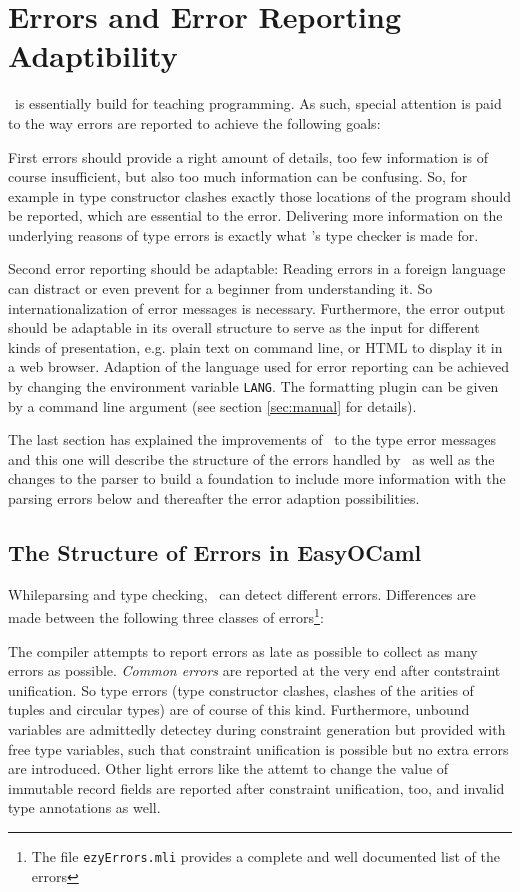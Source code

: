 
\section{Errors and Error Reporting Adaptibility}
\label{sec:errors}

\easyocaml\ is essentially build for teaching programming.
As such, special attention is paid to the way errors are reported to achieve
the following goals:

First errors should provide a right amount of details, too few information
is of course insufficient, but also too much information can be confusing. So,
for example in type constructor clashes exactly those locations of the program
should be reported, which are essential to the error.
Delivering more information on the underlying reasons of type errors is exactly
what \easyocaml's type checker is made for.

Second error reporting should be adaptable: Reading errors in a foreign
language can distract or even prevent for a beginner from understanding it.
So internationalization of error messages is necessary.
Furthermore, the error output should be adaptable in its overall structure to
serve as the input for different kinds of presentation, e.g. plain text on
command line, or HTML to display it in a web browser.
Adaption of the language used for error reporting can be achieved by changing 
the environment variable \texttt{LANG}. The formatting plugin can be given by a
command line argument (see section \ref{sec:manual} for details).

The last section has explained the improvements of \easyocaml\ to the type error
messages and this one will describe the structure  of the errors handled by
\easyocaml\ as well as the changes to the parser to build a foundation to
include more information with the parsing errors below and thereafter the error
adaption possibilities.

\subsection{The Structure of Errors in EasyOCaml}
\label{sec:easyerrors}

While\new parsing and type checking, \easyocaml\ can detect different errors.
Differences are made between the following three classes of errors\footnote{The
file \texttt{ezyErrors.mli} provides a complete and well documented list of the
errors}:

The compiler attempts to report errors as late as possible to collect as many
errors as possible. \emph{Common errors} are reported at the very end after
contstraint unification. So type errors (type constructor clashes, clashes of
the arities of tuples and circular types) are of course of this kind.
Furthermore, unbound variables are admittedly detectey during constraint
generation but provided with free type variables, such that constraint
unification is possible but no extra errors are introduced.
Other light errors like the attemt to change the value of immutable record
fields are reported after constraint unification, too, and invalid type
annotations as well.

